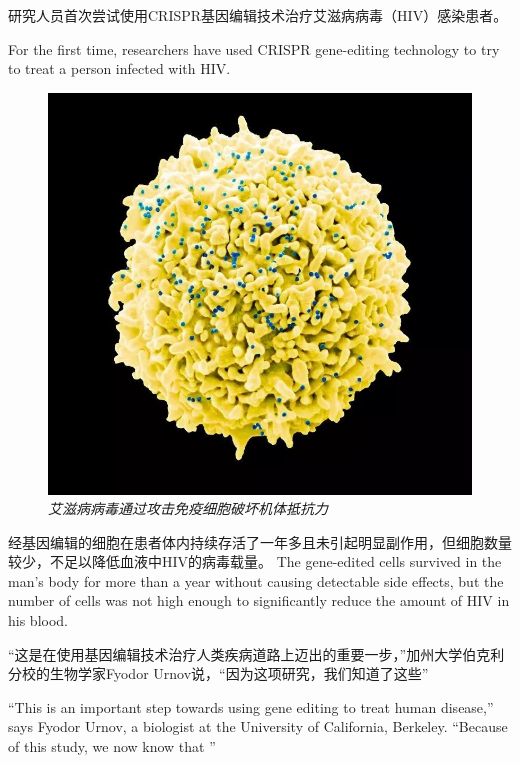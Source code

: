 \begin{multicols}{2}

研究人员首次尝试使用CRISPR基因编辑技术治疗艾滋病病毒（HIV）感染患者。

For the first time, researchers have used CRISPR gene-editing technology to try to treat a person infected with HIV.

\begin{figure}[H]
\centering
\includegraphics[width=0.5\linewidth]{IMG/201909/190901}
\caption{\textit{艾滋病病毒通过攻击免疫细胞破坏机体抵抗力}}
\end{figure}

经基因编辑的细胞在患者体内持续存活了一年多且未引起明显副作用，但细胞数量较少，不足以降低血液中HIV的病毒载量。
 The gene-edited cells survived in the man’s body for more than a year without causing detectable side effects, but the number of cells was not high enough to significantly reduce the amount of HIV in his blood.

“这是在使用基因编辑技术治疗人类疾病道路上迈出的重要一步，”加州大学伯克利分校的生物学家Fyodor Urnov说，“因为这项研究，我们知道了这些”

“This is an important step towards using gene editing to treat human disease,” says Fyodor Urnov, a biologist at the University of California, Berkeley. “Because of this study, we now know that ”


\end{multicols}

